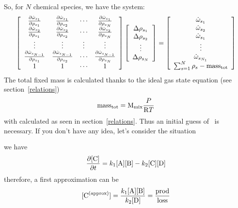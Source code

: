 So, for $N$ chemical species, we have the system:
\begin{equation}
\left[\begin{array}{cccc}
\doverdm[s_1]{\mdot[s_1]}     & \doverdm[s_2]{\mdot[s_1]}     & \cdots & \doverdm[s_N]{\mdot[s_1]} \\
\doverdm[s_1]{\mdot[s_2]}     & \doverdm[s_2]{\mdot[s_2]}     & \cdots & \doverdm[s_N]{\mdot[s_2]} \\
\vdots                        & \vdots                        & \vdots & \vdots                    \\
\doverdm[s_1]{\mdot[s_{N-1}]} & \doverdm[s_2]{\mdot[s_{N-1}]} & \cdots & \doverdm[s_N]{\mdot[s_{N-1}]}\\
1                             & 1                             & \cdots & 1\\
\end{array}\right]
\left[\begin{array}{c}
\Delta\mass[s_1]\\
\Delta\mass[s_2]\\
\vdots\\
\Delta\mass[s_N]\\
\end{array}\right]
=
\left[\begin{array}{c}
\mdot[s_1]\\
\mdot[s_2]\\
\mdot[s_1]\\
\vdots\\
\mdot[s_{N_1}]\\
\sum_{s=1}^N\mass[s] - \mathrm{mass_{tot}}
\end{array}\right]
\label{eq:matrixes}
\end{equation}
The total fixed mass is calculated thanks to the ideal gas state equation
(see section~\ref{relations})
\begin{equation}
\mathrm{mass_{tot}} = \Mm[\mathrm{mix}] \frac{P}{\Rg T}
\label{tot_mass}
\end{equation}
with  calculated as seen in section~\ref{relations}.
Thus an initial guess of \massfrac\ is necessary.
If you don't have any idea, let's consider the situation
\begin{chemicalEquation}
\label{youpi}
\end{chemicalEquation}
we have
\begin{equation}
\doverdt{\conc[C]} = k_1\conc[A]\conc[B] - k_2\conc[C]\conc[D]
\end{equation}
therefore, a first approximation can be
\begin{equation}
\conc[C^{(\text{approx})}] = \frac{k_1\conc[A]\conc[B]}{k_2\conc[D]} = \frac{\mathrm{prod}}{\mathrm{loss}}
\end{equation}

